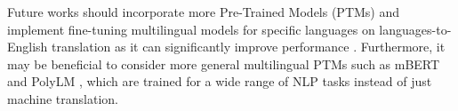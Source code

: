 \documentclass[a4paper, 11pt]{article}
\begin{document}
Future works should incorporate more Pre-Trained Models (PTMs) and implement fine-tuning multilingual models for specific languages on languages-to-English translation as it can significantly improve performance \cite{zhang-2023-fine-tuning}. Furthermore, it may be beneficial to consider more general multilingual PTMs such as mBERT \cite{wu-2020-mbert-are-all} and PolyLM \cite{wei-2023-polylm}, which are trained for a wide range of NLP tasks instead of just machine translation.

\printbibliography
\end{document}
